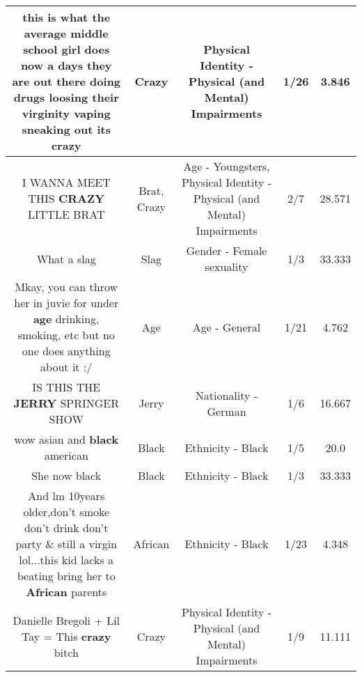 \documentclass[11pt]{article}
\newlength\mylength
\begin{document}
\begin{center}
\begin{longtable}{|C{.65\mylength}|C{.30\mylength}|C{.12\mylength}|C{.12\mylength}|C{.12\mylength}|}
  \small this is what the average middle school girl does now a days they are out there doing drugs loosing their virginity vaping sneaking out its crazy\normalsize   & Crazy & Physical Identity - Physical (and Mental) Impairments & 1/26 & 3.846 \\  \hline
  \small I WANNA MEET THIS \textbf{CRAZY} LITTLE BRAT\normalsize   & Brat, Crazy & Age - Youngsters, Physical Identity - Physical (and Mental) Impairments & 2/7 & 28.571 \\  \hline
  \small What a slag\normalsize   & Slag & Gender - Female sexuality & 1/3 & 33.333 \\  \hline
  \small Mkay, you can throw her in juvie for under \textbf{age} drinking, smoking, etc but no one does anything about it :/\normalsize   & Age & Age - General & 1/21 & 4.762 \\  \hline
  \small IS THIS THE \textbf{JERRY} SPRINGER SHOW\normalsize   & Jerry & Nationality - German & 1/6 & 16.667 \\  \hline
  \small wow asian and \textbf{black} american\normalsize   & Black & Ethnicity - Black & 1/5 & 20.0 \\  \hline
  \small She now black\normalsize   & Black & Ethnicity - Black & 1/3 & 33.333 \\  \hline
  \small And lm 10years older,don't smoke don't drink don't party \& still a virgin lol...this kid lacks a beating bring her to \textbf{African} parents\normalsize   & African & Ethnicity - Black & 1/23 & 4.348 \\  \hline
  \small Danielle Bregoli + Lil Tay = This \textbf{crazy} bitch\normalsize   & Crazy & Physical Identity - Physical (and Mental) Impairments & 1/9 & 11.111 \\  \hline

\end{longtable}
\end{center}
\end{document}
